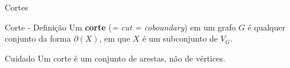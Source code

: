 \documentclass[xcolor=dvipsnames,table]{beamer}
\begin{document}
	\begin{frame}{Cortes}
		\begin{block}{Corte - Definição}
			Um {\bf corte} ({\it = cut = coboundary}) em um grafo $G$ é qualquer conjunto da forma $\partial(X)$, em que $X$ é um subconjunto de $V_G$.
		\end{block} \pause
		\begin{alertblock}{Cuidado}
			Um corte é um conjunto de arestas, não de vértices.
		\end{alertblock}
	\end{frame}
	
	\begin{frame}
		\titlepage
	\end{frame}
	
\end{document}
